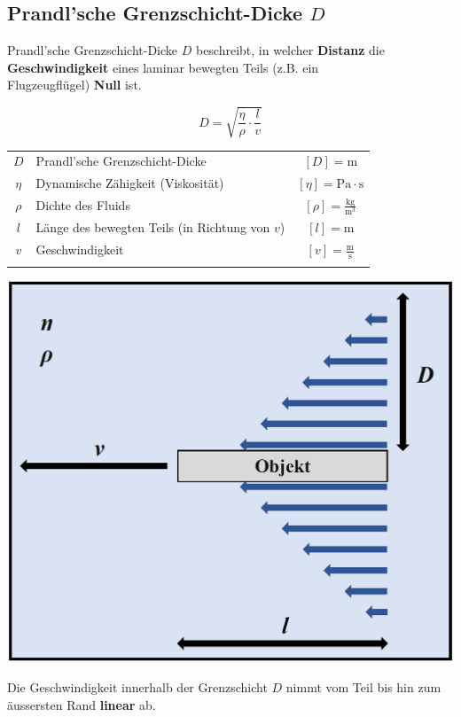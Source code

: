 \subsection{Prandl'sche Grenzschicht-Dicke $D$}\label{Grenzschichtdicke}
Prandl'sche Grenzschicht-Dicke $D$ beschreibt, in welcher \textbf{Distanz} die \textbf{Geschwindigkeit} eines laminar bewegten Teils (z.B. ein \\
Flugzeugflügel) \textbf{Null} ist. 

$$\boxed{ D = \sqrt{\frac{\eta}{\rho} \cdot \frac{l}{v}} }$$


\begin{tabular}{c l c}
		$D$ & Prandl'sche Grenzschicht-Dicke & $[D] = \mathrm{m}$ \\
		$\eta$ & Dynamische Zähigkeit (Viskosität) & $[\eta] = \mathrm{Pa \cdot s}$  \\
		\rule{0pt}{8pt}$\rho$ & Dichte des Fluids & $[\rho] = \mathrm{\frac{kg}{m^3}}$ \\
		$l$ & Länge des bewegten Teils (in Richtung von $v$) & $[l] = \mathrm{m}$ \\
		\rule{0pt}{8pt}$v$ & Geschwindigkeit & $[v] = \mathrm{\frac{m}{s}}$ \\
			\\
\end{tabular}

\begin{minipage}{0.48\linewidth}
\includegraphics[width=0.8\linewidth]{Bilder/prandl}
\end{minipage}
\hfill
\begin{minipage}{0.48\linewidth}
Die Geschwindigkeit innerhalb der Grenzschicht $D$ nimmt vom Teil bis hin zum äussersten Rand \textbf{linear} ab.
\end{minipage}


